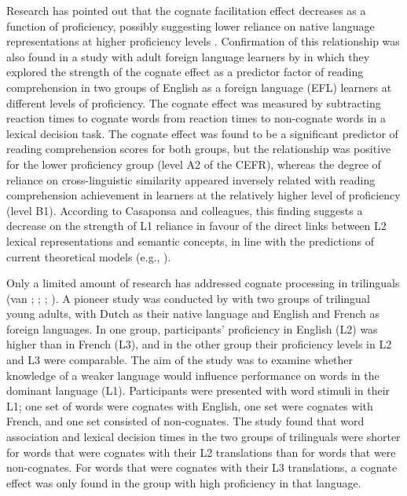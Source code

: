 \documentclass[output=paper,modfonts,nonflat,newtxmath]{langsci/langscibook}
\begin{document}
 {Research has pointed out that the cognate facilitation effect decreases as a function of proficiency, possibly suggesting lower reliance on native language representations at higher proficiency levels \citep{KrollEtAl2010}. Confirmation of this relationship was also found in a study with adult foreign language learners by \citet{CasaponsaEtAl2015} in which they explored the strength of the cognate effect as a predictor factor of reading comprehension in two groups of English as a foreign language (EFL) learners at different levels of proficiency. The cognate effect was measured by subtracting reaction times to cognate words from reaction times to non-cognate words in a lexical decision task. The cognate effect was found to be a significant predictor of reading comprehension scores for both groups, but the relationship was positive for the lower proficiency group (level A2 of the CEFR), whereas the degree of reliance on cross-linguistic similarity appeared inversely related with reading comprehension achievement in learners at the relatively higher level of proficiency (level B1). According to Casaponsa and colleagues, this finding suggests a decrease on the strength of L1 reliance in favour of the direct links between L2 lexical representations and semantic concepts, in line with the predictions of current theoretical models (e.g., \citealt{KrollStewart1994}).}

 {Only a limited amount of research has addressed cognate processing in trilinguals (van \citealt{VanHellDijkstra2002}; \citealt{LemhoferEtAl2004}; \citealt{Szubko-Sitarek2011}; \citealt{PoarchvanHell2012}). A pioneer study was conducted by \citet{VanHellDijkstra2002} with two groups of trilingual young adults, with Dutch as their native language and English and French as foreign languages. In one group, participants’ proficiency in English (L2) was higher than in French (L3), and in the other group their proficiency levels in L2 and L3 were comparable. The aim of the study was to examine whether knowledge of a weaker language would influence performance on words in the dominant language (L1). Participants were presented with word stimuli in their L1; one set of words were cognates with English, one set were cognates with French, and one set consisted of non-cognates. The study found that word association and lexical decision times in the two groups of trilinguals were shorter for words that were cognates with their L2 translations than for words that were non-cognates. For words that were cognates with their L3 translations, a cognate effect was only found in the group with high proficiency in that language.}
\end{document}
